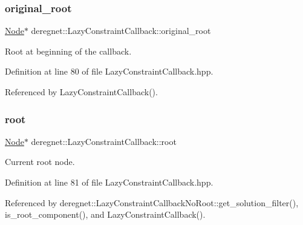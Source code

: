\subsubsection{\texorpdfstring{original\+\_\+root}{original\_root}}
{\footnotesize\ttfamily \hyperlink{namespacederegnet_a744bad34f2de9856d36715a445f027f3}{Node}$\ast$ deregnet\+::\+Lazy\+Constraint\+Callback\+::original\+\_\+root\hspace{0.3cm}{\ttfamily [protected]}}



Root at beginning of the callback. 



Definition at line 80 of file Lazy\+Constraint\+Callback.\+hpp.



Referenced by Lazy\+Constraint\+Callback().

\mbox{\label{classderegnet_1_1LazyConstraintCallback_aa4df18debaaf3aaace54a48b0c3e56ca}} 
\subsubsection{\texorpdfstring{root}{root}}
{\footnotesize\ttfamily \hyperlink{namespacederegnet_a744bad34f2de9856d36715a445f027f3}{Node}$\ast$ deregnet\+::\+Lazy\+Constraint\+Callback\+::root\hspace{0.3cm}{\ttfamily [protected]}}



Current root node. 



Definition at line 81 of file Lazy\+Constraint\+Callback.\+hpp.



Referenced by deregnet\+::\+Lazy\+Constraint\+Callback\+No\+Root\+::get\+\_\+solution\+\_\+filter(), is\+\_\+root\+\_\+component(), and Lazy\+Constraint\+Callback().

\mbox{\label{classderegnet_1_1LazyConstraintCallback_a5ddc4662e6e5c9f1d191c15edbefaa9b}} 
